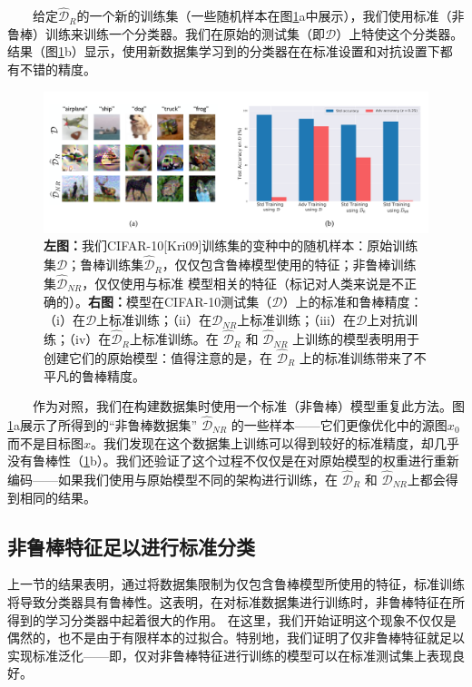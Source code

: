 \documentclass{article}
\begin{document}
\ \ \ \ 给定$\widehat{\mathcal{D}}_{R}$的一个新的训练集（一些随机样本在图\ref{fig:2}a中展示），我们使用标准（非鲁棒）训练来训练一个分类器。我们在原始的测试集（即$\mathcal{D}$）上特使这个分类器。结果（图\ref{fig:2}b）显示，使用新数据集学习到的分类器在在标准设置和对抗设置下都有不错的精度。

\begin{figure}[h]
  \centering
  \includegraphics[width=13cm]{fig/figure2.png}
  \caption{\textbf{左图：}我们CIFAR-10[Kri09]训练集的变种中的随机样本：原始训练集$\mathcal{D}$；鲁棒训练集$\widehat{\mathcal{D}}_{R}$，仅仅包含鲁棒模型使用的特征；非鲁棒训练集$\widehat{\mathcal{D}}_{N R}$，仅仅使用与标准 模型相关的特征（标记对人类来说是不正确的）。\textbf{右图：}模型在CIFAR-10测试集（$\mathcal{D}$）上的标准和鲁棒精度：（i）在$\mathcal{D}$上标准训练；（ii）在$\widehat{\mathcal{D}}_{N R}$上标准训练；（iii）在$\mathcal{D}$上对抗训练；（iv）在$\widehat{\mathcal{D}}_{R}$上标准训练。在 $\widehat{\mathcal{D}}_{R}$ 和 $\widehat{\mathcal{D}}_{NR}$ 上训练的模型表明用于创建它们的原始模型：值得注意的是，在 $\widehat{\mathcal{D}}_{R}$ 上的标准训练带来了不平凡的鲁棒精度。}
  \label{fig:2}
\end{figure}

\ \ \ \ 作为对照，我们在构建数据集时使用一个标准（非鲁棒）模型重复此方法。图\ref{fig:2}a展示了所得到的“非鲁棒数据集” $\widehat{\mathcal{D}}_{NR}$ 的一些样本——它们更像优化中的源图$x_0$而不是目标图$x$。我们发现在这个数据集上训练可以得到较好的标准精度，却几乎没有鲁棒性（\ref{fig:2}b）。我们还验证了这个过程不仅仅是在对原始模型的权重进行重新编码——如果我们使用与原始模型不同的架构进行训练，在 $\widehat{\mathcal{D}}_{R}$ 和  $\widehat{\mathcal{D}}_{NR}$上都会得到相同的结果。

\subsection{非鲁棒特征足以进行标准分类}

上一节的结果表明，通过将数据集限制为仅包含鲁棒模型所使用的特征，标准训练将导致分类器具有鲁棒性。这表明，在对标准数据集进行训练时，非鲁棒特征在所得到的学习分类器中起着很大的作用。
在这里，我们开始证明这个现象不仅仅是偶然的，也不是由于有限样本的过拟合。特别地，我们证明了仅非鲁棒特征就足以实现标准泛化——即，仅对非鲁棒特征进行训练的模型可以在标准测试集上表现良好。
\end{document}
